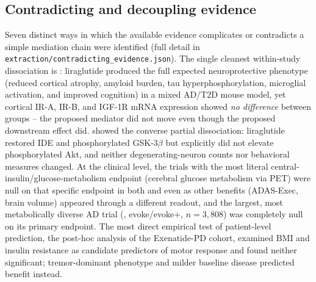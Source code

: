 \documentclass[11pt, a4paper]{article}
\begin{document}
\subsection{Contradicting and decoupling evidence}
Seven distinct ways in which the available evidence complicates or
contradicts a simple mediation chain were identified (full detail in
\texttt{extraction/contradicting\_evidence.json}). The single cleanest
within-study dissociation is \citet{carranza2021}: liraglutide produced the
full expected neuroprotective phenotype (reduced cortical atrophy, amyloid
burden, tau hyperphosphorylation, microglial activation, and improved
cognition) in a mixed AD/T2D mouse model, yet cortical IR-A, IR-B, and
IGF-1R mRNA expression showed \emph{no difference} between groups -- the
proposed mediator did not move even though the proposed downstream effect
did. \citet{paladugu2021} showed the converse partial dissociation: liraglutide
restored IDE and phosphorylated GSK-3$\beta$ but explicitly did not elevate
phosphorylated Akt, and neither degenerating-neuron counts nor behavioral
measures changed. At the clinical level, the trials with the most literal
central-insulin/glucose-metabolism endpoint (cerebral glucose metabolism via
PET) were null on that specific endpoint in both \citet{gejl2016} and
\citet{edison2025} even as other benefits (ADAS-Exec, brain volume) appeared
through a different readout, and the largest, most metabolically diverse AD
trial (\citet{cummings2026}, evoke/evoke+, $n=3{,}808$) was completely null
on its primary endpoint. The most direct empirical test of patient-level
prediction, the \citet{athauda2019} post-hoc analysis of the Exenatide-PD
cohort, examined BMI and insulin resistance as candidate predictors of motor
response and found neither significant; tremor-dominant phenotype and
milder baseline disease predicted benefit instead.
\end{document}
